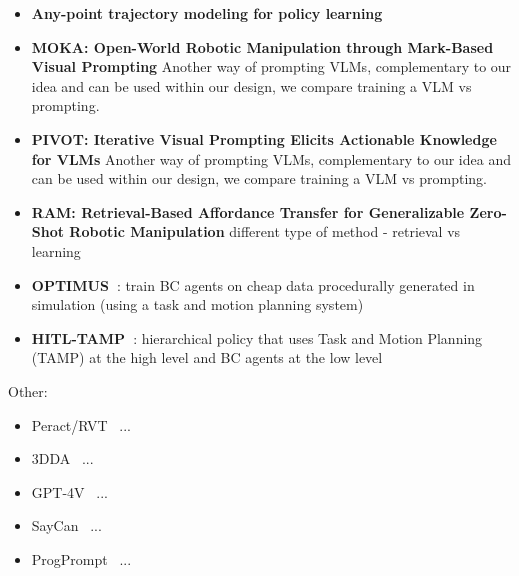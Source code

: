 \begin{itemize}
    \item \textbf{Any-point trajectory modeling for policy learning} 
    \item \textbf{MOKA: Open-World Robotic Manipulation through Mark-Based Visual Prompting} Another way of prompting VLMs, complementary to our idea and can be used within our design, we compare training a VLM vs prompting.
    \item \textbf{PIVOT: Iterative Visual Prompting Elicits Actionable Knowledge for VLMs} Another way of prompting VLMs, complementary to our idea and can be used within our design, we compare training a VLM vs prompting.
    \item \textbf{RAM: Retrieval-Based Affordance Transfer for Generalizable Zero-Shot Robotic Manipulation} different type of method - retrieval vs learning
    \item \textbf{OPTIMUS~\citep{dalal2023imitating}}: train BC agents on cheap data procedurally generated in simulation (using a task and motion planning system)
    \item \textbf{HITL-TAMP~\citep{garrett2021integrated,mandlekar2023human}}: hierarchical policy that uses Task and Motion Planning (TAMP) at the high level and BC agents at the low level
\end{itemize}

Other:
\begin{itemize}
    \item Peract/RVT~\citep{shridhar2023perceiver,goyal2023rvt,goyal2024rvt} ...
    \item 3DDA~\citep{gervet2023act3d,ke20243d} ...
    \item GPT-4V~\citep{openai2024gpt4} ...
    \item SayCan~\citep{brohan2023can} ...
    \item ProgPrompt~\citep{singh2023progprompt} ...
\end{itemize}
